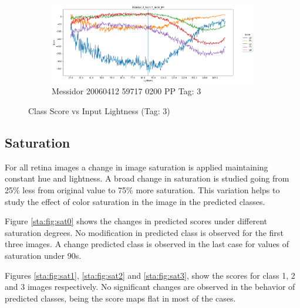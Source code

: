 \begin{figure}[ht!]
\begin{subfigure}[b]{ 0.85\textwidth}
		\centering
		\includegraphics[width=\textwidth]{Figures/chapter_stability/20060412_59717_0200_PP/l/scores.png}
		\caption{Messidor 20060412 59717 0200 PP Tag: 3}		
	\end{subfigure}
	\hfill 
	\caption[Score vs Lightness (Tag: 3)]{Class Score vs Input Lightness (Tag: 3)}  
	\label{sta:fig:lig3} 
\end{figure}

\subsection{Saturation}

For all retina images a change in image saturation is applied maintaining constant hue and lightness. A broad change in saturation is studied going from 25\% less from original value to 75\% more saturation. This variation helps to study the effect of color saturation in the image in the predicted classes.

Figure \ref{sta:fig:sat0} shows the changes in predicted scores under different saturation degrees. No modification in predicted class is observed for the first three images. A change predicted class is observed in the last case for values of saturation under 90s.

Figures \ref{sta:fig:sat1}, \ref{sta:fig:sat2} and \ref{sta:fig:sat3},  show the scores for class 1, 2 and 3 images respectively. No significant changes are observed in the behavior of predicted classes, being the score maps flat in most of the cases.

